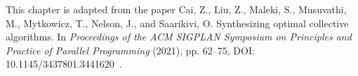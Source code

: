 \newcommand{\broadcasting}{non-com\-bin\-ing\xspace}
\newcommand{\broadcastingCap}{Non-com\-bin\-ing\xspace}
\newcommand{\reducing}{com\-bin\-ing\xspace}
\newcommand{\reducingCap}{Com\-bin\-ing\xspace}

\newcommand{\etal}{\textit{et al}.}

This chapter is adapted from the paper Cai, Z., Liu, Z., Maleki, S., Musuvathi, M., Mytkowicz, T., Nelson, J., and Saarikivi,
O. Synthesizing optimal collective algorithms. In \textit{Proceedings of the ACM SIGPLAN
Symposium on Principles and Practice of Parallel Programming} (2021), pp. 62–75, DOI: 10.1145/3437801.3441620~\cite{sccl}.








